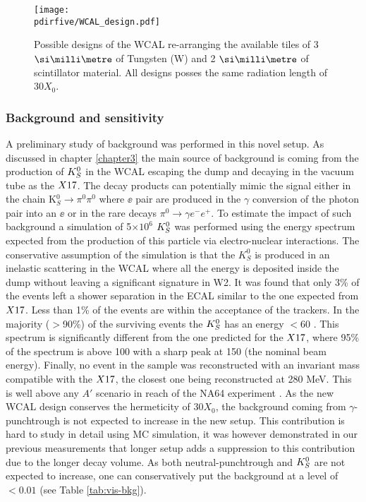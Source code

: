 \begin{figure}[tbh!]
  \centering
  \texttt{[image: \\pdirfive/WCAL\_design.pdf]}
  \caption[New WCAL design for 2021]{Possible designs of the WCAL re-arranging the available tiles of 3 $\mmi$ of Tungsten (W) and 2 $\mmi$ of scintillator material. All designs posses the same radiation length of 30$X_0$.}
  \label{fig:wcal-design}
\end{figure}


\subsubsection{Background and sensitivity}
\label{ch5:sec:background-sensitivity}

A preliminary study of background was performed in this novel setup. As discussed in chapter \ref{chapter3} the main source of background is coming from the production of $K^0_S$ in the WCAL escaping the dump and decaying in the vacuum tube as the $X17$. The decay products can potentially mimic the signal either in the chain K$^0_S \rightarrow \pi^0 \pi^0$ where $\ee$ pair are produced in the $\gamma$ conversion of the photon pair into an $\ee$ or in the rare decays $\pi^0 \rightarrow \gamma e^- e^+$. To estimate the impact of such background a simulation of 5$\times 10^6$ $K^0_S$ was performed using the energy spectrum expected from the production of this particle via electro-nuclear interactions.
The conservative assumption of the simulation is that the $K^0_S$ is produced in an inelastic scattering in the WCAL where all the energy is deposited inside the dump without leaving a significant signature in W2. It was found that only 3\% of the events left a shower separation in the ECAL similar to the one expected from $X17$. Less than 1\% of the events are within the acceptance of the trackers. In the majority ($>$90\%) of the surviving events the $K^0_S$ has an energy $<$60 \gev. This spectrum is significantly different from the one predicted for the $X17$, where 95\% of the spectrum is above 100 \gev with a sharp peak at 150 \gev (the nominal beam energy). Finally, no event in the sample was reconstructed with an invariant mass compatible with the $X17$, the closest one being reconstructed at 280 MeV. This is well above any $A'$ scenario in reach of the NA64 experiment \cite{Banerjee:2019hmi}. As the new WCAL design conserves the hermeticity of 30$X_0$, the background coming from $\gamma$-punchtrough is not expected to increase in the new setup. This contribution is hard to study in detail using MC simulation, it was however demonstrated in our previous measurements \cite{Banerjee:2019hmi} that longer setup adds a suppression to this contribution due to the longer decay volume. As both neutral-punchtrough and $K^0_S$ are not expected to increase, one can conservatively put the background at a level of $<0.01$ (see Table \ref{tab:vis-bkg}).

